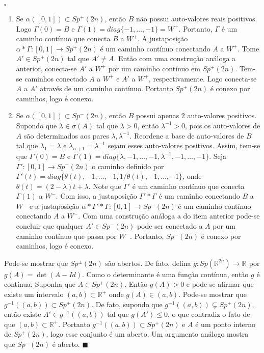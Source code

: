\documentclass[12pt]{book}
\newenvironment{prova}[1]{$\square$ #1}{\hfill$\blacksquare$}
\newcommand{\gruposimpletico}[1]{Sp(#1)}
\newcommand{\gruposimpleticonaodegenerado}[1]{Sp^{#1}(2n)}
\newcommand{\intervalo}{[0,1]}
\newcommand{\real}[1]{\mathbb{R}^{#1}}
\newcommand{\reta}{\real{}}
\begin{document}
\begin{prova}
		\begin{enumerate}
			\item Se $\alpha([0,1]) \subset \gruposimpleticonaodegenerado{+}$, então $B$ não possui auto-valores reais positivos. Logo $\Gamma(0) = B$ e $\Gamma(1) = diag \{-1, \dots, -1\} = W^{+}$. Portanto, $\Gamma$ é um caminho contínuo que conecta $B$ a $W^{+}$. A justaposição $\alpha * \Gamma:\intervalo \to \gruposimpleticonaodegenerado{+}$
			é um caminho contínuo conectando $A$ a $W^{+}$. Tome $A' \in \gruposimpleticonaodegenerado{+}$ tal que $A'\neq A$. Então com uma construção análoga a anterior, conecta-se $A'$ a $W^{+}$ por um caminho contínuo em $\gruposimpleticonaodegenerado{+}$. Tem-se caminhos conectado $A$ a $W^{+}$ e $A'$ a $W^{+}$, respectivamente. Logo conecta-se $A$ a $A'$ através de um caminho contínuo. Portanto $\gruposimpleticonaodegenerado{+}$ é conexo por caminhos, logo é conexo.
			
			\item Se $\alpha([0,1]) \subset \gruposimpleticonaodegenerado{-}$, então $B$ possui apenas 2 auto-valores positivos. Supondo que $\lambda \in \sigma(A)$ tal que $\lambda > 0$, então $\lambda^{-1} > 0$, pois os auto-valores de $A$ são determinados aos pares $\lambda, \lambda^{-1}$. Reordene a base de auto-valores de $B$ tal que $\lambda_{1}=\lambda$ e $\lambda_{n+1}=\lambda^{-1}$ sejam esses auto-valores positivos. Assim, tem-se que $\Gamma(0) = B$ e $\Gamma(1) = diag\{\lambda, -1, \dots, -1, \lambda^{-1}, -1, \dots, -1\}$. Seja $\Gamma': \intervalo \to \gruposimpleticonaodegenerado{-}$ o caminho definido por $\Gamma'(t)=diag\{ \theta(t), -1,\dots, -1, 1/\theta(t) ,-1,\dots, -1\}$,
			onde $\theta(t)=(2- \lambda)t + \lambda$. Note que $\Gamma'$ é um caminho contínuo que conecta $\Gamma(1)$ a $W^{-}$. Com isso, a justaposição $\Gamma'*\Gamma$ é um caminho conectando $B$ a $W^{-}$ e a justaposição $\alpha * \Gamma'*\Gamma: \intervalo \to \gruposimpleticonaodegenerado{-}$ é um caminho contínuo conectando $A$ a $W^{-}$. Com uma construção análoga a do item anterior pode-se concluir que qualquer $A' \in \gruposimpleticonaodegenerado{-}$ pode ser conectado a $A$ por um caminho contínuo que passa por $W^{-}$. Portanto, $\gruposimpleticonaodegenerado{-}$ é conexo por caminhos, logo é conexo.
		\end{enumerate}
		
		Pode-se mostrar que $\gruposimpleticonaodegenerado{\pm}$ são abertos. De fato, defina $g:\gruposimpletico{\real{2n}}\to \reta$ por $g(A) = \det(A-Id)$. Como o determinante é uma função contínua, então $g$ é contínua. Suponha que $A \in \gruposimpleticonaodegenerado{+}$. Então $g(A)>0$ e pode-se afirmar que existe um intervalo $(a,b) \subset \real{+}$ onde $g(A)\in (a,b)$. Pode-se mostrar que $g^{-1}((a,b))\subset \gruposimpleticonaodegenerado{+}$.  De fato, supondo que $g^{-1}((a,b)) \varsubsetneq \gruposimpleticonaodegenerado{+}$, então existe $A' \in g^{-1}((a,b))$ tal que $g(A')\leq 0$, o que contradiz o fato de que $(a,b) \subset \real{+}$. Portanto $g^{-1}((a,b)) \subset \gruposimpleticonaodegenerado{+}$ e $A$ é um ponto interno de $\gruposimpleticonaodegenerado{+}$, logo esse conjunto é um aberto. Um argumento análogo mostra que $\gruposimpleticonaodegenerado{-}$ é aberto.
	\end{prova}
\end{document}
